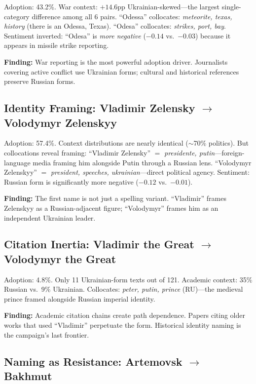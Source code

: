 \documentclass{article}
\begin{document}
Adoption: 43.2\%. War context: $+14.6$pp Ukrainian-skewed---the largest single-category difference among all 6 pairs. ``Odessa'' collocates: \textit{meteorite, texas, history} (there is an Odessa, Texas). ``Odesa'' collocates: \textit{strikes, port, bay}. Sentiment inverted: ``Odesa'' is \textit{more negative} ($-0.14$ vs.\ $-0.03$) because it appears in missile strike reporting.

\textbf{Finding:} War reporting is the most powerful adoption driver. Journalists covering active conflict use Ukrainian forms; cultural and historical references preserve Russian forms.

\subsection{Identity Framing: Vladimir Zelensky $\to$ Volodymyr Zelenskyy}

Adoption: 57.4\%. Context distributions are nearly identical ($\sim$70\% politics). But collocations reveal framing: ``Vladimir Zelensky'' $=$ \textit{presidente, putin}---foreign-language media framing him alongside Putin through a Russian lens. ``Volodymyr Zelenskyy'' $=$ \textit{president, speeches, ukrainian}---direct political agency. Sentiment: Russian form is significantly more negative ($-0.12$ vs.\ $-0.01$).

\textbf{Finding:} The first name is not just a spelling variant. ``Vladimir'' frames Zelenskyy as a Russian-adjacent figure; ``Volodymyr'' frames him as an independent Ukrainian leader.

\subsection{Citation Inertia: Vladimir the Great $\to$ Volodymyr the Great}

Adoption: 4.8\%. Only 11 Ukrainian-form texts out of 121. Academic context: 35\% Russian vs.\ 9\% Ukrainian. Collocates: \textit{peter, putin, prince} (RU)---the medieval prince framed alongside Russian imperial identity.

\textbf{Finding:} Academic citation chains create path dependence. Papers citing older works that used ``Vladimir'' perpetuate the form. Historical identity naming is the campaign's last frontier.

\subsection{Naming as Resistance: Artemovsk $\to$ Bakhmut}
\end{document}
